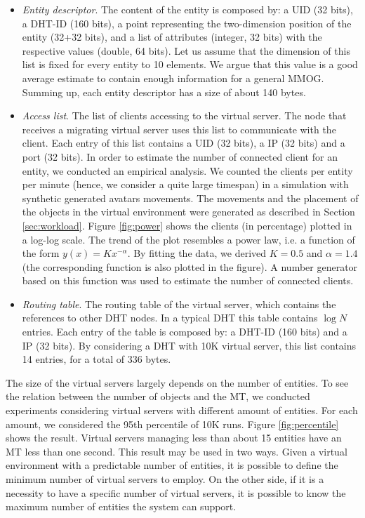 \documentclass[final,10pt,a5paper]{phdimt}
\theoremstyle{definition}
\begin{document}
\begin{itemize}
\item \textit{Entity descriptor}. The content of the entity is composed by: a UID (32 bits), a DHT-ID (160 bits), a point representing the two-dimension position of the entity (32+32 bits), and a list of attributes (integer, 32 bits) with the respective values (double, 64 bits). Let us assume that the dimension of this list is fixed for every entity to 10 elements. We argue that this value is a good average estimate to contain enough information for a general MMOG. Summing up, each entity descriptor has a size of about 140 bytes.

\item \textit{Access list}. The list of clients accessing to the virtual server. The node that receives a migrating virtual server uses this list to communicate with the client. Each entry of this list contains a UID (32 bits), a IP (32 bits) and a port (32 bits).
In order to estimate the number of connected client for an entity, we conducted an empirical analysis.
We counted the clients per entity per minute (hence, we consider a quite large timespan) in a simulation with synthetic generated avatars movements. The movements and the placement of the objects in the virtual environment were generated as described in Section \ref{sec:workload}. 
Figure \ref{fig:power} shows the clients (in percentage) plotted in a log-log scale. The trend of the plot resembles a power law, i.e. a function of the form $y(x) = Kx^{-\alpha}$. By fitting the data, we derived $K=0.5$ and $\alpha =1.4$ (the corresponding function is also plotted in the figure). A number generator based on this function was used to estimate the number of connected clients.


\item \textit{Routing table}. The routing table of the virtual server, which contains the references to other DHT nodes. In a typical DHT this table contains $\log N$ entries.
Each entry of the table is composed by: a DHT-ID (160 bits) and a IP (32 bits). 
By considering a DHT with 10K virtual server, this list contains 14 entries, for a total of 336 bytes.
\end{itemize}


The size of the virtual servers largely depends on the number of entities.
To see the relation between the number of objects and the MT, we conducted experiments considering virtual servers with different amount of entities. 
For each amount, we considered the 95th percentile of 10K runs.
Figure \ref{fig:percentile} shows the result.
Virtual servers managing less than about 15 entities have an MT less than one second.
This result may be used in two ways. Given a virtual environment with a predictable number of entities, it is possible to define the minimum number of virtual servers to employ. On the other side, if it is a necessity to have a specific number of virtual servers, it is possible to know the maximum number of entities the system can support.
\end{document}
